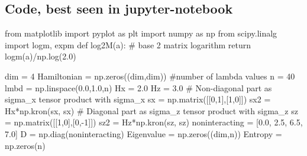\documentclass[%
oneside,                 %
final,                   %
10pt]{article}
\begin{document}
\subsection{Code, best seen in jupyter-notebook}































































\bpycod
from  matplotlib import pyplot as plt
import numpy as np
from scipy.linalg import logm, expm
def log2M(a): # base 2 matrix logarithm
    return logm(a)/np.log(2.0)

dim = 4
Hamiltonian = np.zeros((dim,dim))
#number of lambda values
n = 40
lmbd = np.linspace(0.0,1.0,n)
Hx = 2.0
Hz = 3.0
# Non-diagonal part as sigma_x tensor product with sigma_x
sx = np.matrix([[0,1],[1,0]])
sx2 = Hx*np.kron(sx, sx)
# Diagonal part as sigma_z tensor product with sigma_z
sz = np.matrix([[1,0],[0,-1]])
sz2 = Hz*np.kron(sz, sz)
noninteracting = [0.0, 2.5, 6.5, 7.0]
D = np.diag(noninteracting)
Eigenvalue = np.zeros((dim,n))
Entropy = np.zeros(n)
\end{document}
